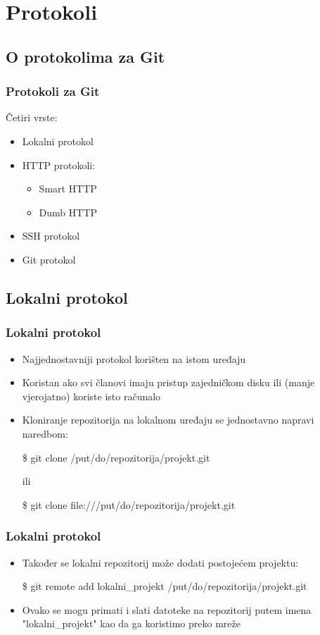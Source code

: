 \section{Protokoli}
\subsection{O protokolima za Git}

\begin{frame}
\frametitle{Protokoli za Git}

Četiri vrste:
\begin{itemize}
	\item Lokalni protokol
	\item HTTP protokoli:
	\begin{itemize}
		\item Smart HTTP
		\item Dumb HTTP
	\end{itemize}
	\item SSH protokol
	\item Git protokol
\end{itemize}
\end{frame}


\subsection{Lokalni protokol}

\begin{frame}
\frametitle{Lokalni protokol}
\begin{itemize}
	\item Najjednostavniji protokol korišten na istom uređaju
	\item Koristan ako svi članovi imaju pristup zajedničkom disku ili (manje vjerojatno) koriste isto računalo
	\item Kloniranje repozitorija na lokalnom uređaju se jednostavno napravi naredbom:

	\$ git clone /put/do/repozitorija/projekt.git

	ili

	\$ git clone file:///put/do/repozitorija/projekt.git
\end{itemize}
\end{frame}

\begin{frame}
\frametitle{Lokalni protokol}
\begin{itemize}
	\item Također se lokalni repozitorij može dodati postojećem projektu:

	\$ git remote add lokalni\_projekt /put/do/repozitorija/projekt.git

	\item Ovako se mogu primati i slati datoteke na repozitorij putem imena "lokalni\_projekt" kao da ga koristimo preko mreže
\end{itemize}
\end{frame}